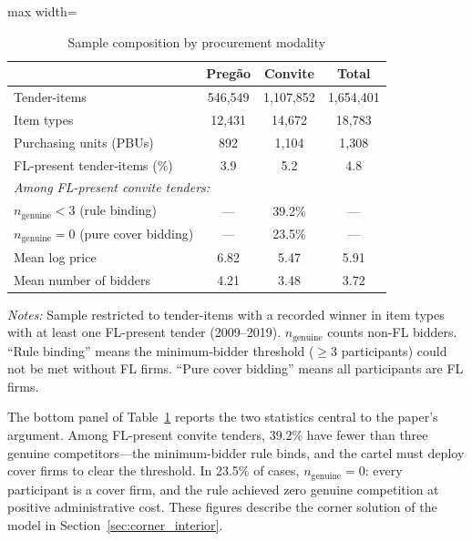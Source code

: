 \begin{table}[htbp]
\centering
\caption{Sample composition by procurement modality}
\label{tab:sample_by_modality}
\begin{adjustbox}{max width=\textwidth}
\begin{threeparttable}
\small
\begin{tabular}{lccc}
\toprule
 & Preg\~ao & Convite & Total \\
\midrule
Tender-items & 546,549 & 1,107,852 & 1,654,401 \\
Item types & 12,431 & 14,672 & 18,783 \\
Purchasing units (PBUs) & 892 & 1,104 & 1,308 \\
FL-present tender-items (\%) & 3.9 & 5.2 & 4.8 \\
\midrule
\multicolumn{4}{l}{\textit{Among FL-present convite tenders:}} \\
\quad $n_{\text{genuine}} < 3$ (rule binding) & --- & 39.2\% & --- \\
\quad $n_{\text{genuine}} = 0$ (pure cover bidding) & --- & 23.5\% & --- \\
\midrule
Mean log price & 6.82 & 5.47 & 5.91 \\
Mean number of bidders & 4.21 & 3.48 & 3.72 \\
\bottomrule
\end{tabular}
\begin{tablenotes}
\small
\item \textit{Notes:} Sample restricted to tender-items with a
recorded winner in item types with at least one FL-present tender
(2009--2019). $n_{\text{genuine}}$ counts non-FL bidders.
``Rule binding'' means the minimum-bidder threshold ($\geq 3$
participants) could not be met without FL firms. ``Pure cover
bidding'' means all participants are FL firms.
\end{tablenotes}
\end{threeparttable}
\end{adjustbox}
\end{table}

The bottom panel of Table~\ref{tab:sample_by_modality} reports the
two statistics central to the paper's argument. Among FL-present
convite tenders, 39.2\% have fewer than three genuine
competitors---the minimum-bidder rule binds, and the cartel must
deploy cover firms to clear the threshold. In 23.5\% of cases,
$n_{\text{genuine}} = 0$: every participant is a cover firm, and
the rule achieved zero genuine competition at positive
administrative cost. These figures describe the corner solution of
the model in Section~\ref{sec:corner_interior}.
